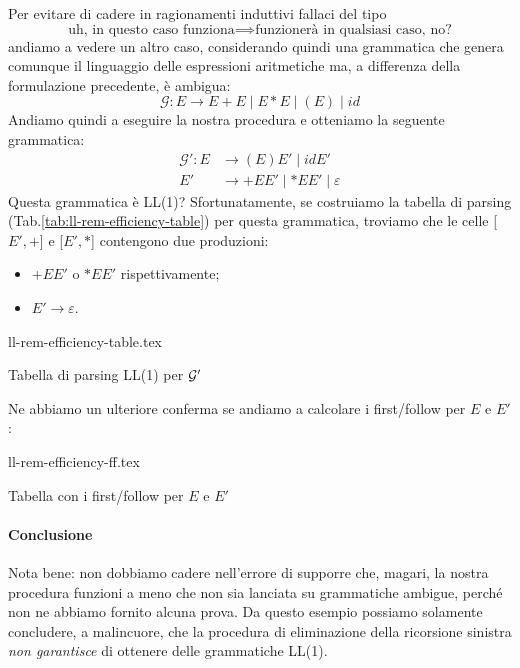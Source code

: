 \documentclass[class=book, crop=false, oneside, 12pt]{standalone}
\begin{document}
Per evitare di cadere in ragionamenti induttivi fallaci del tipo 
\begin{equation*}
    \textrm{uh, in questo caso funziona} \implies \textrm{funzionerà in qualsiasi caso, no?}
\end{equation*}
andiamo a vedere un altro caso, considerando quindi una grammatica che genera comunque il linguaggio delle espressioni aritmetiche ma, a differenza della formulazione precedente, è ambigua:
\begin{equation*}
    \mathcal{G}: E \to E + E \mid E * E \mid (E) \mid id
\end{equation*}
Andiamo quindi a eseguire la nostra procedura e otteniamo la seguente grammatica:
\begin{align*}
    \mathcal{G'}: E &\to (E)E' \mid idE' \\
    E' &\to +EE' \mid \ast EE' \mid \varepsilon
\end{align*}
Questa grammatica è LL(1)? Sfortunatamente, se costruiamo la tabella di parsing (Tab.\ref{tab:ll-rem-efficiency-table}) per questa grammatica, troviamo che le celle [\(E', +\)] e [\(E', \ast\)] contengono due produzioni:
\begin{itemize}[noitemsep]
    \item \(+EE'\) o \(*EE'\) rispettivamente;
    \item \(E' \to \varepsilon\).
\end{itemize}
\begin{table}
    \centering 
    {ll-rem-efficiency-table.tex}
    \caption{Tabella di parsing LL(1) per \(\mathcal{G}'\)}
    \label{tab:ll-rem-efficiency-table}
\end{table}
Ne abbiamo un ulteriore conferma se andiamo a calcolare i first/follow per \(E\) e \(E'\):
\begin{table}[H]
    \centering
    {ll-rem-efficiency-ff.tex}
    \caption{Tabella con i first/follow per \(E\) e \(E'\)}
    \label{ll-rem-efficiency-ff}
\end{table}
\paragraph{Conclusione}
Nota bene: non dobbiamo cadere nell'errore di supporre che, magari, la nostra procedura funzioni a meno che non sia lanciata su grammatiche ambigue, perché non ne abbiamo fornito alcuna prova. Da questo  esempio possiamo solamente concludere, a malincuore, che la procedura di eliminazione della ricorsione sinistra \emph{non garantisce} di ottenere delle grammatiche LL(1).
\end{document}
